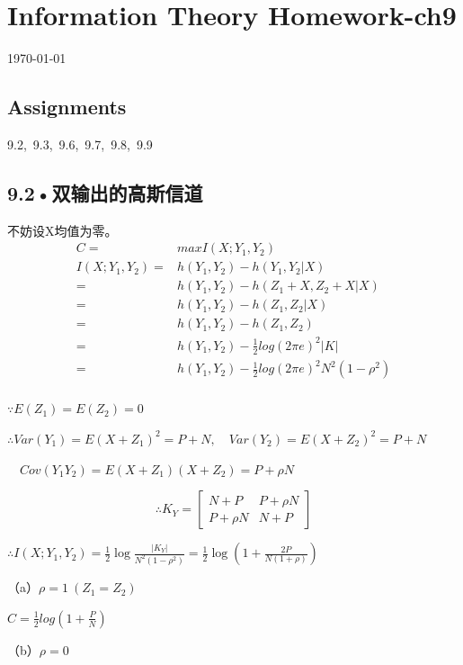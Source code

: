 \documentclass[UTF8]{ctexart}
\begin{document}
\section*{Information Theory Homework-ch9}
\begin{center}
\today
\end{center}
\subsection*{Assignments}


9.2,\  9.3,\  9.6,\  9.7,\  9.8,\  9.9


\subsection*{9.2•双输出的高斯信道}
不妨设X均值为零。
\begin{equation*}
    \begin{split}
        C =& max I(X;Y_1,Y_2)\\
        I(X;Y_1,Y_2)=& h(Y_1,Y_2) - h(Y_1,Y_2|X)\\
        =& h(Y_1,Y_2)-h(Z_1+X,Z_2+X|X)\\
        =& h(Y_1,Y_2)-h(Z_1,Z_2|X)\\
        =& h(Y_1,Y_2)-h(Z_1,Z_2)\\
        =& h(Y_1,Y_2) - \frac{1}{2}log(2\pi e)^2|K|\\
        =& h(Y_1,Y_2) - \frac{1}{2}log(2\pi e)^2N^2(1-\rho ^2)\\
    \end{split}
\end{equation*}

$\because E(Z_1)=E(Z_2)=0$

$\therefore Var(Y_1)=E(X+Z_1)^2 = P+N,\quad Var(Y_2)=E(X+Z_2)^2 = P+N$

$\quad Cov(Y_1Y_2)=E(X+Z_1)(X+Z_2)=P+\rho N$

\[
    \therefore
    K_Y = \begin{bmatrix}
     N+P & P+\rho N \\
     P+\rho N& N+P
    \end{bmatrix}
\]

$\therefore I(X;Y_1,Y_2)=\frac{1}{2}\log \frac{|K_Y|}{N^2(1-\rho^2)}=\frac{1}{2}\log(1+\frac{2P}{N(1+\rho)})$

（a）$\rho =1\  (Z_1=Z_2)$


$ C = \frac{1}{2}log (1+\frac{P}{N})$

（b）$\rho =0$
\end{document}
